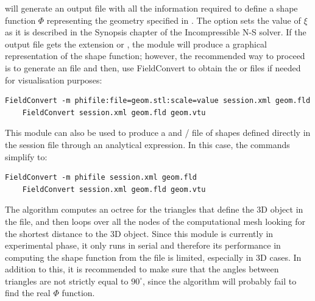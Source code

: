 will generate an output file  with all the information required
to define a shape function $\Phi$ representing the geometry specified in
. The option  sets the value of $\xi$ as it is
described in the Synopsis chapter of the Incompressible N-S solver. If the
output file gets the extension  or , the module will
produce a graphical representation of the shape function; however, the
recommended way to proceed is to generate an  file and then, use
FieldConvert to obtain the  or  files if needed for
visualisation purposes:
\begin{lstlisting}[style=BashInputStyle]
    FieldConvert -m phifile:file=geom.stl:scale=value session.xml geom.fld
    FieldConvert session.xml geom.fld geom.vtu
\end{lstlisting}
This module can also be used to produce a  and  /
 file of shapes defined directly in the session file through an
analytical expression. In this case, the commands simplify to:
\begin{lstlisting}[style=BashInputStyle]
    FieldConvert -m phifile session.xml geom.fld
    FieldConvert session.xml geom.fld geom.vtu
\end{lstlisting}

The algorithm computes an octree for the triangles that define the 3D object
in the  file, and then loops over all the nodes of the
computational mesh looking for the shortest distance to the 3D object. Since
this module is currently in experimental phase, it only runs in serial and
therefore its performance in computing the shape function from the 
file is limited, especially in 3D cases. In addition to this, it is recommended
to make sure that the angles between triangles are not strictly equal to
$90^\circ$, since the algorithm will probably fail to find the real $\Phi$
function.
%
%
%

